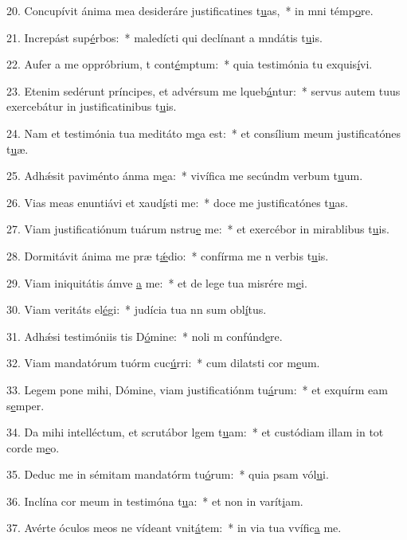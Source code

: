 20. Concupívit ánima mea desideráre justificatines t\uline{u}as,~* in mni témp\uline{o}re.\par 
21. Increpást sup\uline{é}rbos:~* maledícti qui declínant a mndátis t\uline{u}is.\par 
22. Aufer a me oppróbrium, t cont\uline{é}mptum:~* quia testimónia tu exquis\uline{í}vi.\par 
23. Etenim sedérunt príncipes, et advérsum me lqueb\uline{á}ntur:~* servus autem tuus exercebátur in justificatinibus t\uline{u}is.\par 
24. Nam et testimónia tua meditáto m\uline{e}a est:~* et consílium meum justificatónes t\uline{u}æ.\par 
25. Adhǽsit paviménto ánma m\uline{e}a:~* vivífica me secúndm verbum t\uline{u}um.\par 
26. Vias meas enuntiávi et xaud\uline{í}sti me:~* doce me justificatónes t\uline{u}as.\par 
27. Viam justificatiónum tuárum nstru\uline{e} me:~* et exercébor in mirablibus t\uline{u}is.\par 
28. Dormitávit ánima me præ t\uline{ǽ}dio:~* confírma me n verbis t\uline{u}is.\par 
29. Viam iniquitátis ámve \uline{a} me:~* et de lege tua misrére m\uline{e}i.\par 
30. Viam veritáts el\uline{é}gi:~* judícia tua nn sum obl\uline{í}tus.\par 
31. Adhǽsi testimóniis tis D\uline{ó}mine:~* noli m confúnd\uline{e}re.\par 
32. Viam mandatórum tuórm cuc\uline{ú}rri:~* cum dilatsti cor m\uline{e}um.\par 
33. Legem pone mihi, Dómine, viam justificatiónm tu\uline{á}rum:~* et exquírm eam s\uline{e}mper.\par 
34. Da mihi intelléctum, et scrutábor lgem t\uline{u}am:~* et custódiam illam in tot corde m\uline{e}o.\par 
35. Deduc me in sémitam mandatórm tu\uline{ó}rum:~* quia psam vól\uline{u}i.\par 
36. Inclína cor meum in testimóna t\uline{u}a:~* et non in varít\uline{i}am.\par 
37. Avérte óculos meos ne vídeant vnit\uline{á}tem:~* in via tua vvífic\uline{a} me.\par 

